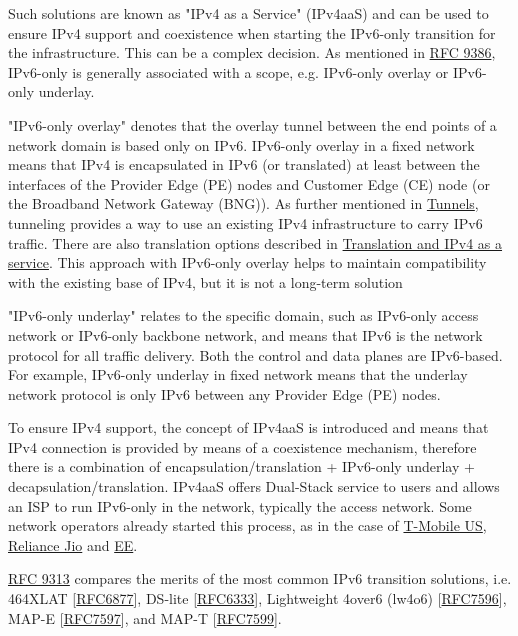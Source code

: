 \documentclass[
]{article}
\begin{document}
Such solutions are known as "IPv4 as a Service" (IPv4aaS) and can be
used to ensure IPv4 support and coexistence when starting the IPv6-only
transition for the infrastructure. This can be a complex decision. As
mentioned in \href{https://www.rfc-editor.org/info/rfc9386}{RFC 9386},
IPv6-only is generally associated with a scope, e.g. IPv6-only overlay
or IPv6-only underlay.

"IPv6-only overlay" denotes that the overlay tunnel between the end
points of a network domain is based only on IPv6. IPv6-only overlay in a
fixed network means that IPv4 is encapsulated in IPv6 (or translated) at
least between the interfaces of the Provider Edge (PE) nodes and
Customer Edge (CE) node (or the Broadband Network Gateway (BNG)). As
further mentioned in \hyperref[tunnels]{Tunnels}, tunneling provides a
way to use an existing IPv4 infrastructure to carry IPv6 traffic. There
are also translation options described in
\hyperref[translation-and-ipv4-as-a-service]{Translation and IPv4 as a
service}. This approach with IPv6-only overlay helps to maintain
compatibility with the existing base of IPv4, but it is not a long-term
solution

"IPv6-only underlay" relates to the specific domain, such as IPv6-only
access network or IPv6-only backbone network, and means that IPv6 is the
network protocol for all traffic delivery. Both the control and data
planes are IPv6-based. For example, IPv6-only underlay in fixed network
means that the underlay network protocol is only IPv6 between any
Provider Edge (PE) nodes.

To ensure IPv4 support, the concept of IPv4aaS is introduced and means
that IPv4 connection is provided by means of a coexistence mechanism,
therefore there is a combination of encapsulation/translation +
IPv6-only underlay + decapsulation/translation. IPv4aaS offers
Dual-Stack service to users and allows an ISP to run IPv6-only in the
network, typically the access network. Some network operators already
started this process, as in the case of
\href{https://pc.nanog.org/static/published/meetings/NANOG73/1645/20180625_Lagerholm_T-Mobile_S_Journey_To_v1.pdf}{T-Mobile
US},
\href{https://datatracker.ietf.org/meeting/109/materials/slides-109-v6ops-ipv6-only-adoption-challenges-and-standardization-requirements-03}{Reliance
Jio} and
\href{https://indico.uknof.org.uk/event/38/contributions/489/attachments/612/736/Nick_Heatley_EE_IPv6_UKNOF_20170119.pdf}{EE}.

\href{https://www.rfc-editor.org/info/rfc9313}{RFC 9313} compares the
merits of the most common IPv6 transition solutions, i.e. 464XLAT
{[}\href{https://www.rfc-editor.org/info/rfc6877}{RFC6877}{]}, DS-lite
{[}\href{https://www.rfc-editor.org/info/rfc6333}{RFC6333}{]},
Lightweight 4over6 (lw4o6)
{[}\href{https://www.rfc-editor.org/info/rfc7596}{RFC7596}{]}, MAP-E
{[}\href{https://www.rfc-editor.org/info/rfc7597}{RFC7597}{]}, and MAP-T
{[}\href{https://www.rfc-editor.org/infoc/rfc7599}{RFC7599}{]}.
\end{document}

